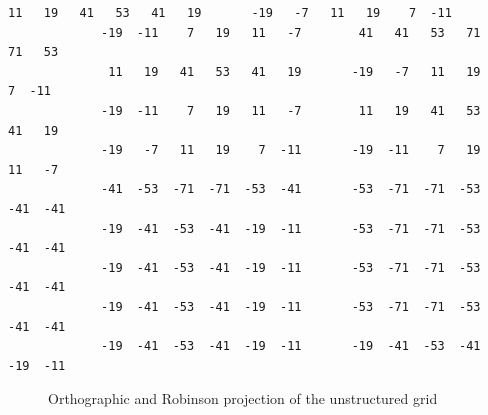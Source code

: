 \begin{lstlisting}[frame=single, backgroundcolor=\color{pcolor1}, basicstyle=\footnotesize]
              11   19   41   53   41   19       -19   -7   11   19    7  -11
             -19  -11    7   19   11   -7        41   41   53   71   71   53
              11   19   41   53   41   19       -19   -7   11   19    7  -11
             -19  -11    7   19   11   -7        11   19   41   53   41   19
             -19   -7   11   19    7  -11       -19  -11    7   19   11   -7
             -41  -53  -71  -71  -53  -41       -53  -71  -71  -53  -41  -41
             -19  -41  -53  -41  -19  -11       -53  -71  -71  -53  -41  -41
             -19  -41  -53  -41  -19  -11       -53  -71  -71  -53  -41  -41
             -19  -41  -53  -41  -19  -11       -53  -71  -71  -53  -41  -41
             -19  -41  -53  -41  -19  -11       -19  -41  -53  -41  -19  -11
\end{lstlisting}

\begin{figure}[b]

\caption[cellgrid]{Orthographic and Robinson projection of the unstructured grid}
\end{figure}

